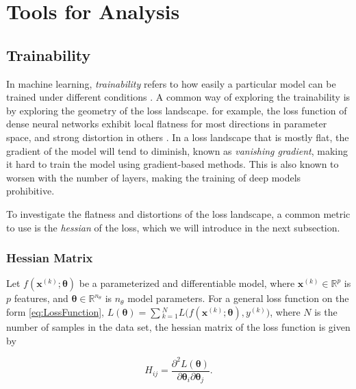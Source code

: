 \chapter{Tools for Analysis}\label{chap:TfA}



\section{Trainability}\label{sec:Trainability}
In machine learning, \emph{trainability} refers to how easily a particular model can be trained under different conditions \cite{abbas2020power}. A common way of exploring the trainability is by exploring the geometry of the loss landscape. for example, the loss function of dense neural networks exhibit local flatness for most directions in parameter space, and strong distortion in others \cite{karakida2019universal}. In a loss landscape that is mostly flat, the gradient of the model will tend to diminish, known as \emph{vanishing gradient}, making it hard to train the model using gradient-based methods. This is also known to worsen with the number of layers, making the training of deep models prohibitive.

To investigate the flatness and distortions of the loss landscape, a common metric to use is the \emph{hessian} of the loss, which we will introduce in the next subsection. 
\subsection{Hessian Matrix}\label{sec:HessianMatrix}
Let $f(\boldsymbol{x}^{(k)}; \boldsymbol{\theta})$ be a parameterized and differentiable model, where $\boldsymbol{x}^{(k)} \in \mathbb{R}^p$ is $p$ features, and $\boldsymbol{\theta} \in \mathbb{R}^{n_\theta}$ is $n_{\theta}$ model parameters. For a general loss function on the form \autoref{eq:LossFunction}, $L(\boldsymbol{\theta}) = \sum{_{k=1}^{N}L(f(\boldsymbol{x}^{(k)};\boldsymbol{\theta}), y^{(k)}})$, where $N$ is the number of samples in the data set, the hessian matrix of the loss function is given by

\begin{equation}
\label{eq:Hessian}
    H_{ij} = \frac{\partial^2 L(\boldsymbol{\theta})}{\partial \boldsymbol{\theta}_i\partial \boldsymbol{\theta}_j}.
\end{equation}

